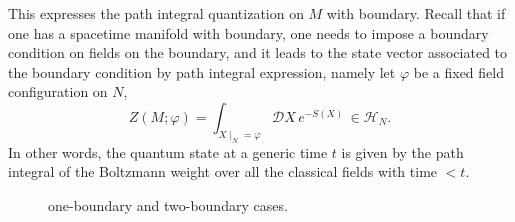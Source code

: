 This expresses the path integral quantization on $M$ with boundary.
Recall that if one has a spacetime manifold with boundary, one needs
to impose a boundary condition on fields on the boundary, and it leads
to the state vector associated to the boundary condition by path integral
expression, namely let $\varphi$ be a fixed field configuration on
$N$, 
\begin{equation}
  Z\left(M;\varphi\right)  =  \int_{X\mid_{N}=\varphi}\mathcal{D}X \, e^{-S\left(X\right)} \,  \in  \mathcal{H}_{N}.
\end{equation}
 In other words, the quantum state at a generic time $t$ is given
by the path integral of the Boltzmann weight over all the classical
fields with time $<t$. 


\begin{figure}
\centering
  \subfloat[\label{fig:one_bdy}]{
    \begin{tikzpicture}[scale=1] %
        \def\bdyradius{0.8cm}
        
        \draw[thick] (0,-\bdyradius) arc[start angle=-90,end angle=90,x radius=1.8cm,y radius=\bdyradius] node[left=0.3,pos=0.5] {$M$};
        \draw[very thick, red!50] (0,0) node[black] {$N$} circle[x radius=0.4cm,y radius=\bdyradius] node[above=\bdyradius+0.1cm, black] {\normalsize$\mathcal{H}_N$};
        
    \end{tikzpicture}
  }
\qquad\qquad
  \subfloat[\label{fig:two_bdy}]{
    \begin{tikzpicture}[scale=1] %
        \def\bdyradius{1cm}
        
        \draw[thick] (0,-\bdyradius) to[out=0,in=180] (1.4cm,0.3cm-\bdyradius) to[out=0,in=180] (4cm,0.2cm-\bdyradius*1.2);
        \draw[thick] (0,\bdyradius) to[out=0,in=180] (2.2cm,-0.2cm+\bdyradius) to[out=0,in=180] (4cm,0.2cm+\bdyradius*1.2);
        
        \draw[very thick, red!50] (0,0) node[black] {$-N_1$} circle[x radius=0.4cm,y radius=\bdyradius];
        \draw[very thick, red!50] (4,0.2) node[black] {$N_2$} circle[x radius=0.4cm,y radius=\bdyradius*1.2];
        
        \node at (2,0) {\small$\tilde M$};
        
    \end{tikzpicture}
  }
  \caption{one-boundary and two-boundary cases.}
  \label{fig:mfd_w_bdys}
\end{figure}


